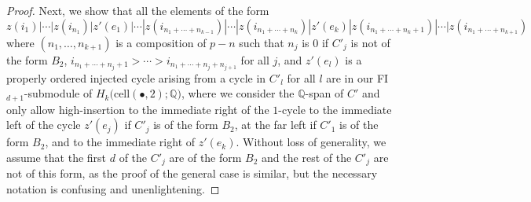 \documentclass[12py]{amsart}%
\theoremstyle{definition}\newtheorem{definition}[thm]{Definition}
\theoremstyle{definition}
\newcommand{\Q}{\ensuremath{\mathbb{Q}}}
\begin{document}
\begin{proof}
Next, we show that all the elements of the form
\[
z(i_{1})|\cdots|z(i_{n_{1}})|z'(e_{1})|\cdots|z(i_{n_{1}+\cdots+n_{k-1}})|\cdots|z(i_{n_{1}+\cdots+n_{k}})|z'(e_{k})|z(i_{n_{1}+\cdots+n_{k}+1})|\cdots|z(i_{n_{1}+\cdots+n_{k+1}})
\]
where $(n_{1},\dots, n_{k+1})$ is a composition of $p-n$ such that $n_{j}$ is $0$ if $C'_{j}$ is not of the form $B_{2}$, $i_{n_{1}+\cdots+n_{j}+1}>\cdots>i_{n_{1}+\cdots+n_{j}+n_{j+1}}$ for all $j$, and $z'(e_{l})$ is a properly ordered injected cycle arising from a cycle in $C'_{l}$ for all $l$ are in our FI$_{d+1}$-submodule of $H_{k}\big(\text{cell}(\bullet, 2);\Q\big)$, where we consider the $\Q$-span of $C'$ and only allow high-insertion to the immediate right of the $1$-cycle to the immediate left of the cycle $z'(e_{j})$ if $C'_{j}$ is of the form $B_{2}$, at the far left if $C'_{1}$ is of the form $B_{2}$, and to the immediate right of $z'(e_{k})$. Without loss of generality, we assume that the first $d$ of the $C'_{j}$ are of the form $B_{2}$ and the rest of the $C'_{j}$ are not of this form, as the proof of the general case is similar, but the necessary notation is confusing and unenlightening.


\end{proof}
\end{document}
